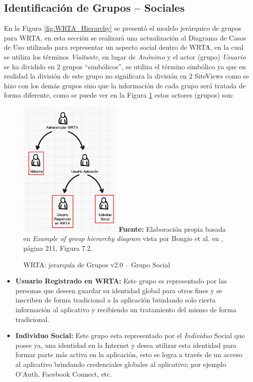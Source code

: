 \documentclass[oneside,12pt,a4paper]{memoir}%
\begin{document}
		\subsection{Identificaci\'on de Grupos -- Sociales}
		\label{ssec:socialGroup}
		En la Figura \ref{fig:WRTA_Hierarchy} se present\'o el modelo jer\'arquico de
		grupos para WRTA, en esta secci\'on se realizar\'a una actualizaci\'on al
		Diagrama de Casos de Uso utilizado para representar un aspecto social dentro
		de WRTA, en la cual se utiliza los t\'erminos \textit{Visitante}, en lugar de
		\textit{An\'onimo} y el  actor (grupo) \textit{Usuario} se ha dividido en $2$
		grupos ``simb\'olicos'', se utiliza el t\'ermino simb\'olico ya que en
		realidad la divisi\'on de este grupo no significara la divisi\'on en $2$
		SiteViews como se hizo con los dem\'as grupos sino que la informaci\'on de
		cada grupo ser\'a tratada de forma diferente, como se puede ver en la Figura
		\ref{fig:WRTA_SocialHierarchy} estos actores (grupos) son:
		 
		\begin{figure}[here]
			\centering 
			\caption{WRTA: jerarqu\'ia de Grupos v2.0 -- Grupo Social}
			\includegraphics[width=0.45\textwidth]{figure/fig_WRTA_Socialhierarchy.png}
			\newline
			\textbf{Fuente:} Elaboraci\'on propia basada en \textit{Example of group
			hierarchy diagram} vista por Bongio et al. en \cite{Ceri2003}, p\'agina
			211, Figura 7.2.
			\label{fig:WRTA_SocialHierarchy}
		\end{figure} 
				
		\begin{itemize}
		  \item \textbf{Usuario Registrado en WRTA:} Este grupo es representado por
		  las personas que deseen guardar su identidad global para otros fines y se
		  inscriben de forma tradicional a la aplicaci\'on brindando solo cierta
		  informaci\'on al aplicativo y recibiendo un tratamiento del mismo de forma
		  tradicional.
		  \item \textbf{Individuo Social:} Este grupo esta representado por el
		  \textit{Individuo} Social que posee ya, una identidad en la Internet y desea
		  utilizar esta identidad para formar parte m\'as activa en la aplicaci\'on,
		  esto se logra a trav\'es de un acceso al aplicativo brindando credenciales
		  globales al aplicativo; por ejemplo O'Auth, Facebook Connect, etc.
		\end{itemize}
\end{document}
